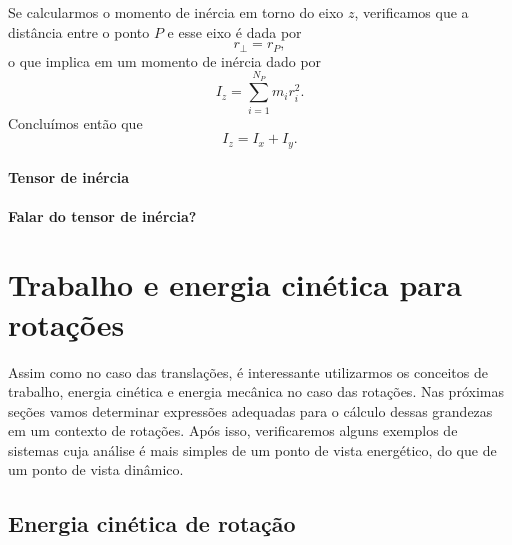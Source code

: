 Se calcularmos o momento de inércia em torno do eixo $z$, verificamos que a distância entre o ponto $P$ e esse eixo é dada por
\begin{equation}
    r_\perp = r_P,
\end{equation}
%
o que implica em um momento de inércia dado por
\begin{equation}
    I_z = \sum_{i = 1}^{N_P} m_i r_i^2.
\end{equation}
%
Concluímos então que
\begin{equation}
    I_z = I_x + I_y.
\end{equation}

\paragraph{Tensor de inércia}

\textbf{Falar do tensor de inércia?}

\section{Trabalho e energia cinética para rotações}

Assim como no caso das translações, é interessante utilizarmos os conceitos de trabalho, energia cinética e energia mecânica no caso das rotações. Nas próximas seções vamos determinar expressões adequadas para o cálculo dessas grandezas em um contexto de rotações. Após isso, verificaremos alguns exemplos de sistemas cuja análise é mais simples de um ponto de vista energético, do que de um ponto de vista dinâmico.

\subsection{Energia cinética de rotação}

